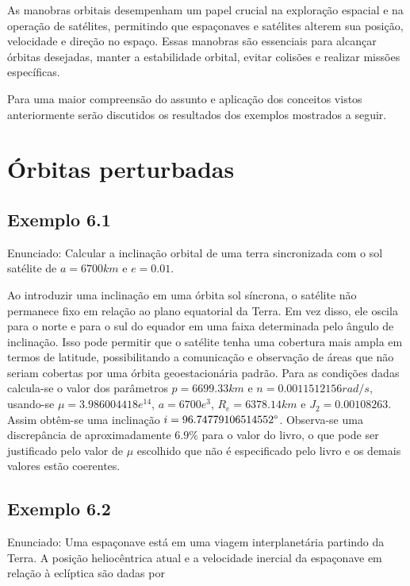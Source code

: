 \par As manobras orbitais desempenham um papel crucial na exploração espacial e na operação de satélites, permitindo que espaçonaves e satélites alterem sua posição, velocidade e direção no espaço. Essas manobras são essenciais para alcançar órbitas desejadas, manter a estabilidade orbital, evitar colisões e realizar missões específicas. \par Para uma maior compreensão do assunto e aplicação dos conceitos vistos anteriormente serão discutidos os resultados dos exemplos mostrados a seguir.






\section{Órbitas perturbadas}

\subsection{Exemplo 6.1}

Enunciado: Calcular a inclinação orbital de uma terra sincronizada com o sol
satélite de $a = 6700 km$ e $e = 0.01$.

Ao introduzir uma inclinação em uma órbita sol síncrona, o satélite não permanece fixo em relação ao plano equatorial da Terra. Em vez disso, ele oscila para o norte e para o sul do equador em uma faixa determinada pelo ângulo de inclinação. Isso pode permitir que o satélite tenha uma cobertura mais ampla em termos de latitude, possibilitando a comunicação e observação de áreas que não seriam cobertas por uma órbita geoestacionária padrão. Para as condições dadas calcula-se o valor dos parâmetros $p = 6699.33km$ e $n = 0.0011512156 rad/s$, usando-se $\mu = 3.986004418e^{14}$, $a = 6700e^{3}$, $R_e = 6378.14km$ e $J_2 = 0.00108263$. Assim obtêm-se uma inclinação $i =  96.74779106514552 \degree$. Observa-se uma discrepância de aproximadamente $6.9 \%$ para o valor do livro, o que pode ser justificado pelo valor de $\mu$ escolhido que não é especificado pelo livro e os demais valores estão coerentes.

\subsection{Exemplo 6.2}

Enunciado: Uma espaçonave está em uma viagem interplanetária partindo da Terra. A posição heliocêntrica atual e a velocidade inercial da espaçonave em relação à eclíptica são dadas por

